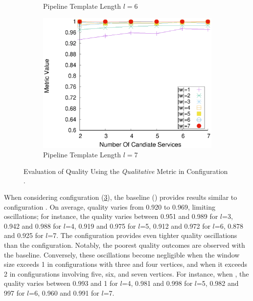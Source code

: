 \begin{figure}[ht!]
\begin{subfigure}{0.49\textwidth}
        \caption{Pipeline Template Length $l$$=$6}
        \label{fig:quality_window_average_qualitative_n6}
      \end{subfigure}
      \hfill
      \begin{subfigure}{0.49\textwidth}
        \includegraphics[width=\textwidth]{Images/graphs/window_quality_performance_diff_qual_n7_s7_50_80_n7}
        \caption{Pipeline Template Length $l$$=$7}
        \label{fig:quality_window_average_qualitative_n7}
      \end{subfigure}

      \caption{Evaluation of Quality Using the \emph{Qualitative} Metric in Configuration \average.}
      \label{fig:quality_window_qualitative_average}

    \end{figure}

    When considering configuration \average (\cref{fig:quality_window_qualitative_average}), the baseline () provides results similar to configuration \wide. On average, quality varies from 0.920 to 0.969, limiting oscillations; for instance, the quality varies between 0.951 and 0.989 for $l$=3, 0.942 and 0.988 for $l$=4, 0.919 and 0.975 for $l$=5, 0.912 and 0.972 for $l$=6, 0.878 and 0.925 for $l$=7. The \average configuration provides even tighter quality oscillations than the \wide configuration. Notably, the poorest quality outcomes are observed with the baseline. Conversely, these oscillations become negligible when the window size exceeds 1 in configurations with three and four vertices, and when it exceeds 2 in configurations involving five, six, and seven vertices.  For instance, when , the quality varies between  0.993 and 1 for $l$=4, 0.981 and 0.998 for $l$=5, 0.982 and 997 for $l$=6, 0.960 and 0.991 for $l$=7.

